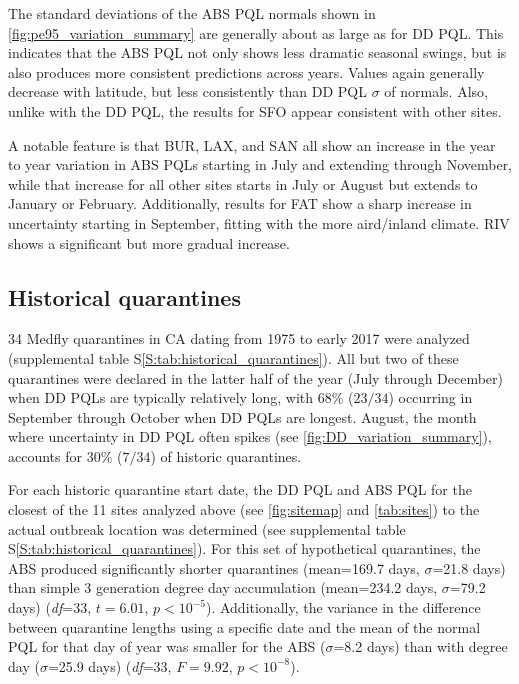 \documentclass[10pt,a4paper,twocolumn]{article}
\begin{document}
The standard deviations of the ABS PQL normals 
shown in \autoref{fig:pe95_variation_summary}
are generally about  as large as for DD PQL.
This indicates that the ABS PQL not only shows less dramatic seasonal swings, 
but is also produces more consistent predictions across years.
Values again generally decrease with latitude, but less consistently than DD PQL $\sigma$ of normals.
Also, unlike with the DD PQL, the results for SFO appear consistent with other sites.

A notable feature is that BUR, LAX, and SAN all show an increase in the year to year variation
in ABS PQLs starting in July and extending through November, 
while that increase for all other sites starts in July or August 
but extends to January or February.
Additionally, results for FAT show a sharp increase in uncertainty starting in September, fitting with the 
more aird/inland climate.  RIV shows a significant but more gradual increase.

\subsection*{Historical quarantines}

34 Medfly quarantines in CA dating from 1975 to early 2017 were analyzed
(supplemental table S\ref{S:tab:historical_quarantines}).
All but two of these quarantines were declared in the latter half of the year
(July through December) when DD PQLs are typically relatively long,
with 68\% ($23/34$) occurring in September through October when DD PQLs are
longest. 
August, the month where uncertainty in DD PQL often spikes 
(see \autoref{fig:DD_variation_summary}), 
accounts for 30\% ($7/34$) of historic quarantines.

For each historic quarantine start date, the DD PQL and ABS PQL 
for the closest of the 11 sites analyzed above (see \autoref{fig:sitemap} and \autoref{tab:sites}) 
to the actual outbreak location was determined
(see supplemental table S\ref{S:tab:historical_quarantines}).
For this set of hypothetical quarantines, 
the ABS produced significantly shorter quarantines
(mean=169.7 days, $\sigma$=21.8 days)
than simple 3 generation degree day accumulation
(mean=234.2 days, $\sigma$=79.2 days)
(\textit{df}=33, $t{=}6.01$, $p{<}10^{-5}$).
Additionally, the variance in the difference between quarantine lengths
using a specific date and the mean of the normal PQL for that day of year
was smaller for the ABS ($\sigma$=8.2 days)
than with degree day ($\sigma$=25.9 days)
(\textit{df}=33, $F{=}9.92$, $p{<}10^{-8}$).
\end{document}
